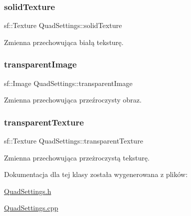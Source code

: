 \subsubsection{\texorpdfstring{solid\+Texture}{solidTexture}}
{\footnotesize\ttfamily sf\+::\+Texture Quad\+Settings\+::solid\+Texture}

Zmienna przechowująca białą teksturę. \mbox{\label{class_quad_settings_a0278924ea9c2eabc3fee5b1407cd36e8}} 
\subsubsection{\texorpdfstring{transparent\+Image}{transparentImage}}
{\footnotesize\ttfamily sf\+::\+Image Quad\+Settings\+::transparent\+Image}

Zmienna przechowująca przeźroczysty obraz. \mbox{\label{class_quad_settings_a5b25effa96e1e0c522377ea31f0ec1b0}} 
\subsubsection{\texorpdfstring{transparent\+Texture}{transparentTexture}}
{\footnotesize\ttfamily sf\+::\+Texture Quad\+Settings\+::transparent\+Texture}

Zmienna przechowująca przeżroczystą teksturę. 

Dokumentacja dla tej klasy została wygenerowana z plików\+:\begin{DoxyCompactItemize}
\item 
\mbox{\hyperlink{_quad_settings_8h}{Quad\+Settings.\+h}}\item 
\mbox{\hyperlink{_quad_settings_8cpp}{Quad\+Settings.\+cpp}}\end{DoxyCompactItemize}
